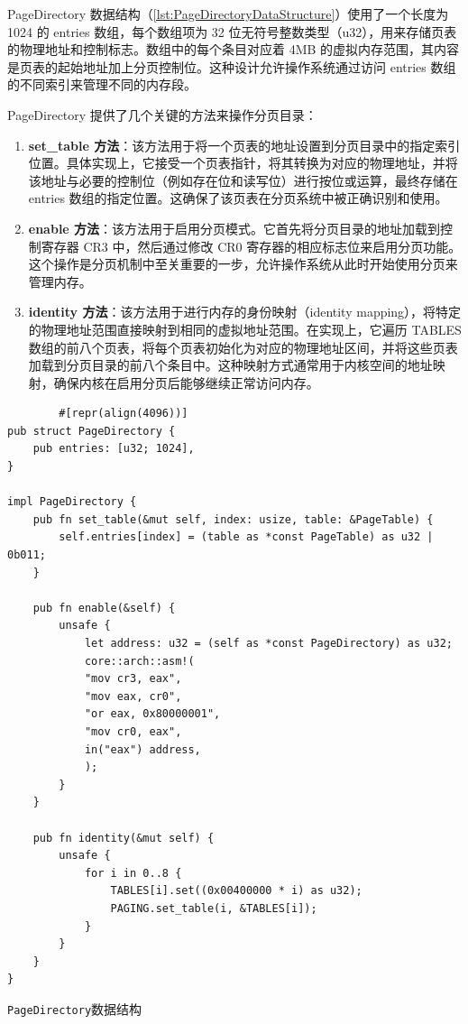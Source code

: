 PageDirectory 数据结构（\cref{lst:PageDirectoryDataStructure}）使用了一个长度为 1024 的 entries 数组，每个数组项为 32 位无符号整数类型（u32），用来存储页表的物理地址和控制标志。数组中的每个条目对应着 4MB 的虚拟内存范围，其内容是页表的起始地址加上分页控制位。这种设计允许操作系统通过访问 entries 数组的不同索引来管理不同的内存段。

PageDirectory 提供了几个关键的方法来操作分页目录：

\begin{enumerate}
    \item \textbf{set\_table 方法}：该方法用于将一个页表的地址设置到分页目录中的指定索引位置。具体实现上，它接受一个页表指针，将其转换为对应的物理地址，并将该地址与必要的控制位（例如存在位和读写位）进行按位或运算，最终存储在 entries 数组的指定位置。这确保了该页表在分页系统中被正确识别和使用。
    \item \textbf{enable 方法}：该方法用于启用分页模式。它首先将分页目录的地址加载到控制寄存器 CR3 中，然后通过修改 CR0 寄存器的相应标志位来启用分页功能。这个操作是分页机制中至关重要的一步，允许操作系统从此时开始使用分页来管理内存。
    \item \textbf{identity 方法}：该方法用于进行内存的身份映射（identity mapping），将特定的物理地址范围直接映射到相同的虚拟地址范围。在实现上，它遍历 TABLES 数组的前八个页表，将每个页表初始化为对应的物理地址区间，并将这些页表加载到分页目录的前八个条目中。这种映射方式通常用于内核空间的地址映射，确保内核在启用分页后能够继续正常访问内存。
\end{enumerate}

\begin{listing}[htbp]
    \begin{verbatim}
        #[repr(align(4096))]
pub struct PageDirectory {
    pub entries: [u32; 1024],
}

impl PageDirectory {
    pub fn set_table(&mut self, index: usize, table: &PageTable) {
        self.entries[index] = (table as *const PageTable) as u32 | 0b011;
    }

    pub fn enable(&self) {
        unsafe {
            let address: u32 = (self as *const PageDirectory) as u32;
            core::arch::asm!(
            "mov cr3, eax",
            "mov eax, cr0",
            "or eax, 0x80000001",
            "mov cr0, eax",
            in("eax") address,
            );
        }
    }

    pub fn identity(&mut self) {
        unsafe {
            for i in 0..8 {
                TABLES[i].set((0x00400000 * i) as u32);
                PAGING.set_table(i, &TABLES[i]);
            }
        }
    }
}
    \end{verbatim}
    \caption{\texttt{PageDirectory}数据结构}\label{lst:PageDirectoryDataStructure}
\end{listing}

